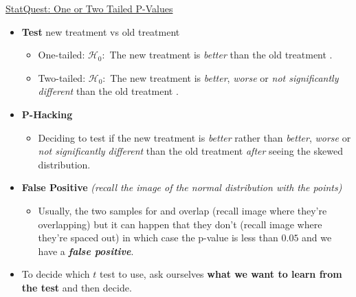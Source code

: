 \documentclass[12pt, titlepage, french]{report}
\begin{document}
\begin{YTB_SUMM}{\href{https://www.youtube.com/watch?v=bsZGt-caXO4}{StatQuest: One or Two Tailed P-Values}}
\begin{itemize}
	\item	\textbf{Test} new treatment \tikzcircle[burntorange, fill=burntorange]{3pt} vs old treatment \tikzcircle[black, fill=black]{3pt}
	\begin{itemize}
		\item	One-tailed: $\mathcal{H}_{0}:$ The new treatment \tikzcircle[burntorange, fill=burntorange]{3pt} is \textit{better} than the old treatment \tikzcircle[black, fill=black]{3pt}.
		\item	Two-tailed: $\mathcal{H}_{0}:$ The new treatment \tikzcircle[burntorange, fill=burntorange]{3pt} is \textit{better}, \textit{worse} or \textit{not significantly different} than the old treatment \tikzcircle[black, fill=black]{3pt}.
	\end{itemize}
	\item	\textbf{P-Hacking}
	\begin{itemize}
		\item	Deciding to test if the new treatment \tikzcircle[burntorange, fill=burntorange]{3pt} is \textit{better} rather than \textit{better}, \textit{worse} or \textit{not significantly different} than the old treatment \tikzcircle[black, fill=black]{3pt} \textit{after} seeing the skewed distribution.
	\end{itemize}
	\item	\textbf{False Positive} \textit{(recall the image of the normal distribution with the points)}
	\begin{itemize}
		\item	Usually, the two samples for \tikzcircle[burntorange, fill=burntorange]{3pt} and \tikzcircle[black, fill=black]{3pt} overlap (recall image where they're overlapping) but it can happen that they don't (recall image where they're spaced out) in which case the p-value is less than $0.05$ and we have a \textbf{\textit{false positive}}.
	\end{itemize}
	\item	To decide which $t$ test to use, ask ourselves \textbf{what we want to learn from the test} and then decide.
\end{itemize}
\end{YTB_SUMM}
\end{document}
